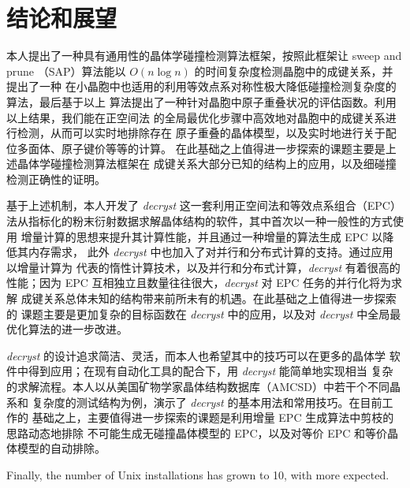 
\chapter{结论和展望}

本人提出了一种具有通用性的晶体学碰撞检测算法框架，按照此框架让 sweep and prune%
（SAP）算法能以 $O(n\log n)$ 的时间复杂度检测晶胞中的成键关系，并提出了一种
在小晶胞中也适用的利用等效点系对称性极大降低碰撞检测复杂度的算法，最后基于以上
算法提出了一种针对晶胞中原子重叠状况的评估函数。利用以上结果，我们能在正空间法
的全局最优化步骤中高效地对晶胞中的成键关系进行检测，从而可以实时地排除存在
原子重叠的晶体模型，以及实时地进行关于配位多面体、原子键价等等的计算。
在此基础之上值得进一步探索的课题主要是上述晶体学碰撞检测算法框架在
成键关系大部分已知的结构上的应用，以及细碰撞检测正确性的证明。

基于上述机制，本人开发了 \emph{decryst} 这一套利用正空间法和等效点系组合（EPC）
法从指标化的粉末衍射数据求解晶体结构的软件，其中首次以一种一般性的方式使用
增量计算的思想来提升其计算性能，并且通过一种增量的算法生成 EPC 以降低其内存需求，
此外 \emph{decryst} 中也加入了对并行和分布式计算的支持。通过应用以增量计算为
代表的惰性计算技术，以及并行和分布式计算，\emph{decryst} 有着很高的性能；因为
EPC 互相独立且数量往往很大，\emph{decryst} 对 EPC 任务的并行化将为求解
成键关系总体未知的结构带来前所未有的机遇。在此基础之上值得进一步探索的
课题主要是更加复杂的目标函数在 \emph{decryst} 中的应用，以及对
\emph{decryst} 中全局最优化算法的进一步改进。

\emph{decryst} 的设计追求简洁、灵活，而本人也希望其中的技巧可以在更多的晶体学
软件中得到应用；在现有自动化工具的配合下，用 \emph{decryst} 能简单地实现相当
复杂的求解流程。本人以从美国矿物学家晶体结构数据库（AMCSD）中若干个不同晶系和
复杂度的测试结构为例，演示了 \emph{decryst} 的基本用法和常用技巧。在目前工作的
基础之上，主要值得进一步探索的课题是利用增量 EPC 生成算法中剪枝的思路动态地排除
不可能生成无碰撞晶体模型的 EPC，以及对等价 EPC 和等价晶体模型的自动排除。

\begin{rquote}{0.4\textwidth}
	Finally, the number of Unix installations
	has grown to 10, with more expected.
\end{rquote}

